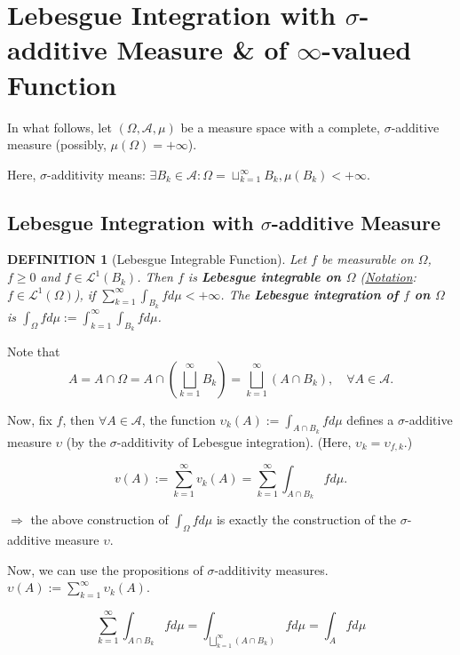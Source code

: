 \documentclass[12pt]{article}
\theoremstyle{blueplain}
\theoremstyle{bluedef}
\newtheorem{definition}{DEFINITION}[section]
\theoremstyle{blueremark}
\newcommand{\ups}{\upsilon}
\numberwithin{equation}{section}
\begin{document}
\clearpage


\section{Lebesgue Integration with $\sigma$-additive Measure \& of $\infty$-valued Function}

\noindent In what follows, let $(\Omega, \mathcal{A}, \mu)$ be a measure space with a complete, $\sigma$-additive measure (possibly, $\mu(\Omega) = +\infty$).

\noindent Here, $\sigma$-additivity means: $\exists B_k \in \mathcal{A}: \Omega = \sqcup_{k=1}^\infty B_k, \mu(B_k) < +\infty$.

\clearpage

\subsection{Lebesgue Integration with $\sigma$-additive Measure}

\begin{definition}[Lebesgue Integrable Function]

  Let $f$ be measurable on $\Omega$, $f \geq 0$ and $f \in \mathcal{L}^1(B_k)$. Then $f$ is \textbf{Lebesgue integrable on $\Omega$} (\underline{Notation}: $f \in \mathcal{L}^1(\Omega)$), if $\sum_{k=1}^\infty \int_{B_k} f d\mu < +\infty$. The \textbf{Lebesgue integration of $f$ on $\Omega$} is $\int_\Omega f d\mu := \int_{k=1}^\infty \int_{B_k} f d\mu$.
\end{definition}

Note that $$A = A \cap \Omega = A \cap \left( \bigsqcup_{k=1}^\infty B_k \right) = \bigsqcup_{k=1}^\infty (A \cap B_k), \quad \forall A \in \mathcal{A}.$$

Now, fix $f$, then $\forall A \in \mathcal{A}$, the function $\ups_k(A) := \int_{A \cap B_k} f d\mu$ defines a $\sigma$-additive measure $\ups$ (by the $\sigma$-additivity of Lebesgue integration). (Here, $\ups_k = \ups_{f,k}$.)

$$v(A) := \sum_{k=1}^\infty v_k(A) = \sum_{k=1}^\infty \int_{A \cap B_k} f d\mu.$$

$\Rightarrow$ the above construction of $\int_\Omega f d\mu$ is exactly the construction of the $\sigma$-additive measure $\ups$.

Now, we can use the propositions of $\sigma$-additivity measures. $\ups(A) := \sum_{k=1}^\infty \ups_k(A)$.

$$\sum_{k=1}^\infty \int_{A \cap B_k} f d\mu = \int_{\bigsqcup_{k=1}^\infty (A \cap B_k)} f d\mu = \int_A f d\mu$$
\end{document}
